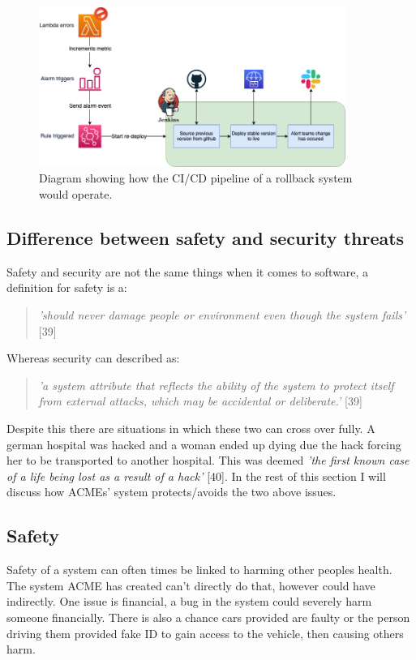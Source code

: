   \begin{figure}[H]
    \centering
    \includegraphics[width=10cm]{assets/rollbackPipeline.drawio.png}
    \caption{Diagram showing how the CI/CD pipeline of a rollback system would operate.}
    \label{fig:rollbackPipeline}
  \end{figure}
  
  \subsection{Difference between safety and security threats}

  Safety and security are not the same things when it comes to software, a definition for safety is a:
  \begin{quote}
    \textit{'should never damage people or environment even though the system fails'} [39]
  \end{quote}

  Whereas security can described as:
  \begin{quote}
    \textit{'a system attribute that reflects the ability of the system to protect itself from external attacks, which may be accidental or deliberate.'} [39]
  \end{quote}

  Despite this there are situations in which these two can cross over fully. A german hospital was hacked and a woman ended up dying due the hack forcing her 
  to be transported to another hospital. This was deemed \textit{'the first known case of a life being lost as a result of a hack'} [40].
  In the rest of this section I will discuss how ACMEs' system protects/avoids the two above issues.

  \subsection{Safety}
  Safety of a system can often times be linked to harming other peoples health. The system ACME has created can't directly do that, however could have 
  indirectly. One issue is financial, a bug in the system could severely harm someone financially. There is also a chance cars provided 
  are faulty or the person driving them provided fake ID to gain access to the vehicle, then causing others harm.

